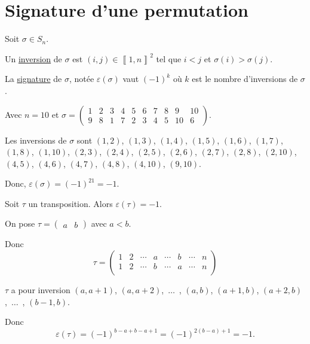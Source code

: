 \part{Signature d'une permutation}

\begin{defn}
	Soit $\sigma \in S_n$.

	Un \underline{inversion} de $\sigma$ est $(i,j) \in \left\llbracket 1,n \right\rrbracket^2$ tel que $i < j$ et $\sigma(i) >\sigma(j)$.

	La \underline{signature} de $\sigma$, notée $\varepsilon(\sigma)$ vaut $(-1)^k$ où $k$ est le nombre d'inversions de $\sigma$.
\end{defn}

\begin{exm}
	Avec $n = 10$ et $\sigma = \begin{pmatrix}
		1&2&3&4&5&6&7&8&9&10\\
		9&8&1&7&2&3&4&5&10&6
	\end{pmatrix}$.

	Les inversions de $\sigma$ sont $(1,2)$, $(1,3)$, $(1,4)$, $(1,5)$, $(1,6)$, $(1,7)$, $(1,8)$, $(1,10)$, $(2,3)$, $(2,4)$, $(2,5)$, $(2,6)$, $(2,7)$, $(2,8)$, $(2, 10)$, $(4,5)$, $(4,6)$, $(4,7)$, $(4,8)$, $(4,10)$, $(9,10)$.

	Donc, $\varepsilon(\sigma) = (-1)^{21} = -1$.
\end{exm}

\begin{prop}
	Soit $\tau$ un transposition. Alors $\varepsilon(\tau) = -1$.
\end{prop}

\begin{prv}
	On pose $\tau = \begin{pmatrix}
		a&b
	\end{pmatrix}$ avec $a < b$.

	Donc \[
		\tau = \begin{pmatrix}
			1&2&\cdots&a&\cdots&b&\cdots&n\\
			1&2&\cdots&b&\cdots&a&\cdots&n\\
		\end{pmatrix}
	\]

	$\tau$ a pour inversion $(a,a+1)$, $(a, a+2)$,~$\ldots$~, $(a,b)$, $(a+1,b)$, $(a+2,b)$,~$\ldots$~, $(b-1,b)$.

	Donc \[
		\varepsilon(\tau) = (-1)^{b-a+b-a+1} = (-1)^{2(b-a) + 1} = -1.
	\] 
\end{prv}

